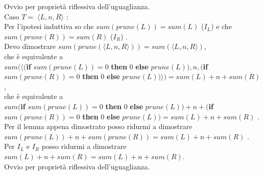 \documentclass[
  a4paper,
]{article}
\begin{document}
\begin{examplebox}
Ovvio per proprietà riflessiva dell'uguaglianza.\\
Caso \(T = \; \langle L, n, R \rangle\) :\\
Per l'ipotesi induttiva so che \(sum(prune(L)) = sum(L)\) (\(I_L\)) e
che \(sum(prune(R)) = sum(R)\) (\(I_R\)) .\\
Devo dimostrare
\(sum(prune(\langle L, n, R \rangle)) = sum(\langle L, n, R \rangle)\),\\
che è equivalente a\\
\(sum(\langle(\)\textbf{if} \(sum(prune(L)) = 0\) \textbf{then} \(0\)
\textbf{else} \(prune(L)), n, (\)\textbf{if} \(sum(prune(R)) = 0\)
\textbf{then} \(0\) \textbf{else}
\(prune(L))\rangle) = sum(L) + n + sum(R)\) ,\\
che è equivalente a\\
\(sum(\)\textbf{if} \(sum(prune(L)) = 0\) \textbf{then} \(0\)
\textbf{else} \(prune(L)) + n + (\)\textbf{if} \(sum(prune(R)) = 0\)
\textbf{then} \(0\) \textbf{else} \(prune(L)) = sum(L) + n + sum(R)\)
.\\
Per il lemma appena dimostrato posso ridurmi a dimostrare
\(sum(prune(L)) + n + sum(prune(R))= sum(L) + n + sum(R)\) .\\
Per \(I_L\) e \(I_R\) posso ridurmi a dimostrare
\(sum(L) + n + sum(R) = sum(L) + n + sum(R)\).\\
Ovvio per proprietà riflessiva dell'uguaglianza.

\end{examplebox}

\newpage
\end{document}
